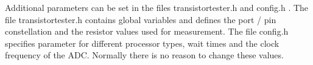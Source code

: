 Additional parameters can be set in the files transistortester.h and config.h .
The file transistortester.h contains global variables and defines the port / pin constellation
and the resistor values used for measurement.
The file config.h specifies parameter for different processor types, wait times and the clock
frequency of the ADC. Normally there is no reason to change these values.
